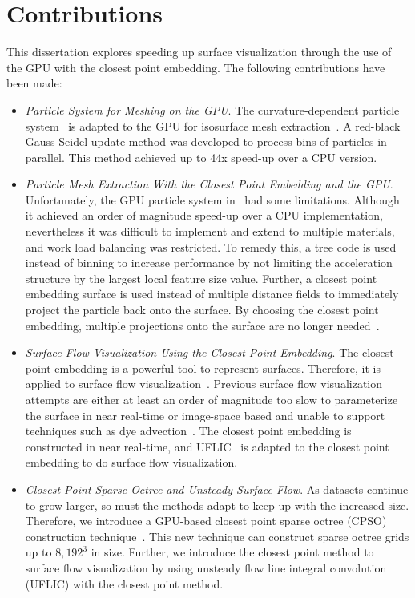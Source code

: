 
\section{Contributions}
\label{sec:contribution}
This dissertation explores speeding up surface visualization through the use of the GPU with the closest point embedding. The following contributions have been made:
\begin{itemize}
\item \textit{Particle System for Meshing on the GPU}. The curvature-dependent particle system~\cite{SCI:Mey2007b} is adapted to the GPU for isosurface mesh extraction~\cite{SCI:Kim2012}. A red-black Gauss-Seidel update method was developed to process bins of particles in parallel. This method achieved up to 44x speed-up over a CPU version.
\item \textit{Particle Mesh Extraction With the Closest Point Embedding and the GPU}. Unfortunately, the GPU particle system in~\cite{SCI:Kim2012} had some limitations. Although it achieved an order of magnitude speed-up over a CPU implementation, nevertheless it was difficult to implement and extend to multiple materials, and work load balancing was restricted. To remedy this, a tree code is used instead of binning to increase performance by not limiting the acceleration structure by the largest local feature size value. Further, a closest point embedding surface is used instead of multiple distance fields to immediately project the particle back onto the surface. By choosing the closest point embedding, multiple projections onto the surface are no longer needed~\cite{SCI:Kim2015b}.
\item \textit{Surface Flow Visualization Using the Closest Point Embedding}. The closest point embedding is a powerful tool to represent surfaces. Therefore, it is applied to surface flow visualization~\cite{SCI:Kim2015a}. Previous surface flow visualization attempts are either at least an order of magnitude too slow to parameterize the surface in near real-time or image-space based and unable to support techniques such as dye advection~\cite{Li:2006:GIA:2384796.2384800,DBLP:conf/visualization/LarameeJH03,DBLP:conf/visualization/Wijk03}. The closest point embedding is constructed in near real-time, and UFLIC~\cite{663898, Li:2006:GIA:2384796.2384800} is adapted to the closest point embedding to do surface flow visualization.
\item \textit{Closest Point Sparse Octree and Unsteady Surface Flow}. As datasets continue to grow larger, so must the methods adapt to keep up with the increased size. Therefore, we introduce a GPU-based closest point sparse octree (CPSO) construction technique~\cite{SCI:Kim2016a}. This new technique can construct sparse octree grids up to $8,192^3$ in size. Further, we introduce the closest point method to surface flow visualization by using unsteady flow line integral convolution (UFLIC) with the closest point method.
\end{itemize}

